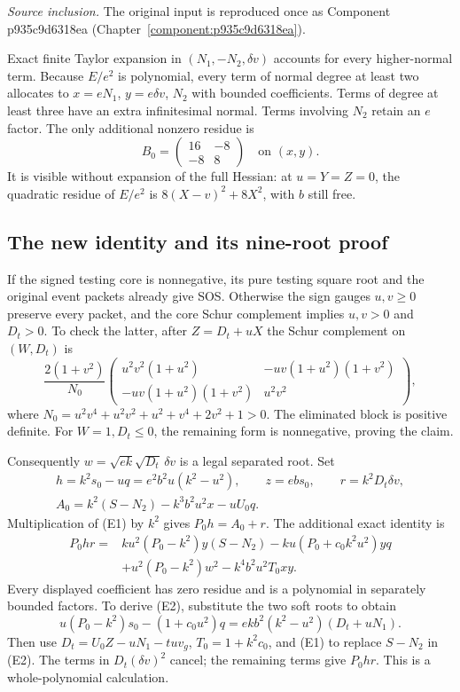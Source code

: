 \par\noindent\textit{Source inclusion. }The original input is reproduced once as Component p935c9d6318ea (Chapter~\ref{component:p935c9d6318ea}).\par

Exact finite Taylor expansion in $(N_1,-N_2,\delta v)$ accounts for every higher-normal term. Because $E/e^2$ is polynomial, every term of normal degree at least two allocates to $x=eN_1$, $y=e\delta v$, $N_2$ with bounded coefficients. Terms of degree at least three have an extra infinitesimal normal. Terms involving $N_2$ retain an $e$ factor. The only additional nonzero residue is
\[
B_0=\begin{pmatrix}16&-8\\-8&8\end{pmatrix}
\quad\text{on }(x,y).
\]
It is visible without expansion of the full Hessian: at $u=Y=Z=0$, the quadratic residue of $E/e^2$ is $8(X-v)^2+8X^2$, with $b$ still free.

\subsection{The new identity and its nine-root proof}
If the signed testing core is nonnegative, its pure testing square root and the original event packets already give SOS. Otherwise the sign gauges $u,v\ge0$ preserve every packet, and the core Schur complement implies $u,v>0$ and $D_t>0$. To check the latter, after $Z=D_t+uX$ the Schur complement on $(W,D_t)$ is
\[
\frac{2(1+v^2)}{N_0}
\begin{pmatrix}
u^2v^2(1+u^2)&-uv(1+u^2)(1+v^2)\\
-uv(1+u^2)(1+v^2)&u^2v^2
\end{pmatrix},
\]
where $N_0=u^2v^4+u^2v^2+u^2+v^4+2v^2+1>0$. The eliminated block is positive definite. For $W=1,D_t\le0$, the remaining form is nonnegative, proving the claim.

Consequently $w=\sqrt{ek}\sqrt{D_t}\,\delta v$ is a legal separated root. Set
\begin{gather*}
h=k^2s_0-uq=e^2b^2u(k^2-u^2),\qquad z=ebs_0,\qquad r=k^2D_t\delta v,\\
A_0=k^2(S-N_2)-k^3b^2u^2x-uU_0q.
\end{gather*}
Multiplication of (E1) by $k^2$ gives $P_0h=A_0+r$. The additional exact identity is
\begin{align*}
P_0hr={}&ku^2(P_0-k^2)y(S-N_2)
-ku(P_0+c_0k^2u^2)yq\\
&+u^2(P_0-k^2)w^2-k^4b^2u^2T_0xy. \tag{E2}
\end{align*}
Every displayed coefficient has zero residue and is a polynomial in separately bounded factors. To derive (E2), substitute the two soft roots to obtain
\[
u(P_0-k^2)s_0-(1+c_0u^2)q
=ekb^2(k^2-u^2)(D_t+uN_1).
\]
Then use $D_t=U_0Z-uN_1-tu v_g$, $T_0=1+k^2c_0$, and (E1) to replace $S-N_2$ in (E2). The terms in $D_t(\delta v)^2$ cancel; the remaining terms give $P_0hr$. This is a whole-polynomial calculation.

